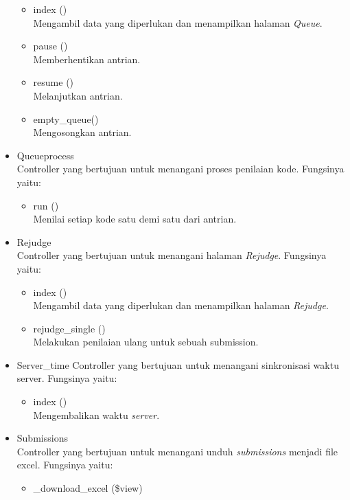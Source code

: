 \begin{itemize}
        \begin{itemize}
            \item index () \\
 Mengambil data yang diperlukan dan menampilkan halaman \textit{Queue}.
            \item pause () \\
 Memberhentikan antrian.
            \item resume () \\
 Melanjutkan antrian.
            \item empty\_queue() \\
 Mengosongkan antrian.
        \end{itemize}
            \item Queueprocess \\
 Controller yang bertujuan untuk menangani proses penilaian kode. Fungsinya yaitu:
    \begin{itemize}
        \item run ()\\
 Menilai setiap kode satu demi satu dari antrian.
    \end{itemize}
        \item Rejudge \\
 Controller yang bertujuan untuk menangani halaman \textit{Rejudge}. Fungsinya yaitu:
        \begin{itemize}
            \item index ()\\
 Mengambil data yang diperlukan dan menampilkan halaman \textit{Rejudge}.
            \item rejudge\_single ()\\
 Melakukan penilaian ulang untuk sebuah submission.
        \end{itemize}
            \item Server\_time
 Controller yang bertujuan untuk menangani sinkronisasi waktu server. Fungsinya yaitu:
        \begin{itemize}
            \item index ()\\
 Mengembalikan waktu \textit{server}.
        \end{itemize}
    \item Submissions \\
 Controller yang bertujuan untuk menangani unduh \textit{submissions} menjadi file excel. Fungsinya yaitu:
    \begin{itemize}
        \item \_download\_excel (\$view)\\

\end{itemize}
\end{itemize}
